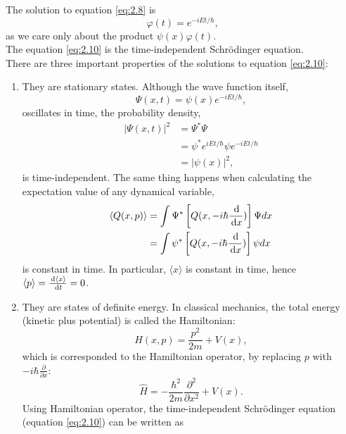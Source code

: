 \documentclass[en, oneside]{vivi}
\begin{document}
The solution to equation \eqref{eq:2.8} is
\begin{equation}
    \varphi(t) = e^{-iEt/\hbar},
\end{equation}
as we care only about the product $\psi(x)\varphi(t)$.\\
The equation \eqref{eq:2.10} is the time-independent Schrödinger equation.\\
There are three important properties of the solutions to equation \eqref{eq:2.10}:
\begin{enumerate}
    \item They are stationary states. Although the wave function itself,
    \begin{equation} \label{eq:stationary state}
        \Psi(x, t) = \psi(x) e^{-iEt/\hbar},
    \end{equation}
    oscillates in time, the probability density,
    \begin{align}
        |\Psi(x, t)|^2 &= \Psi^* \Psi\\
        &= \psi^* e^{iEt/\hbar} \psi e^{-iEt/\hbar}\\
        &= |\psi(x)|^2,
    \end{align}
    is time-independent. The same thing happens when calculating the expectation value of any dynamical variable,
    \begin{align}
        \langle Q(x, p) \rangle &= \int \Psi^* \left[Q(x, -i \hbar \frac{\dif}{\dif x})\right] \Psi dx\\
        &= \int \psi^* \left[Q(x, -i \hbar \frac{\dif}{\dif x})\right] \psi dx
    \end{align}
    is constant in time. In particular, $\langle x \rangle$ is constant in time, hence $\langle p \rangle = \frac{\dif \langle x \rangle}{\dif t} = 0$.
    \item They are states of definite energy. In classical mechanics, the total energy (kinetic plus potential) is called the Hamiltonian:
    \begin{equation}
        H(x, p) = \frac{p^2}{2m} + V(x),
    \end{equation}
    which is corresponded to the Hamiltonian operator, by replacing $p$ with $-i\hbar \frac{\partial}{\partial x}$:
    \begin{equation}
        \hat{H} = -\frac{\hbar^2}{2m} \frac{\partial^2}{\partial x^2} + V(x).
    \end{equation}
    Using Hamiltonian operator, the time-independent Schrödinger equation (equation \eqref{eq:2.10}) can be written as
    \begin{equation}

\end{equation}
\end{enumerate}
\end{document}
